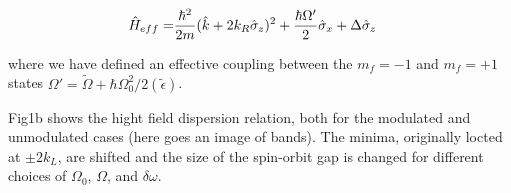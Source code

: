 \begin{align}
	\begin{split}
		\hat{H}_{eff} = & \frac{\hbar^2}{2m}(\hat{k}+2{{k_R}}\hat{\sigma}_z)^2 + \frac{\hbar\Omega'}{2}\hat{\sigma}_x  +\Delta\hat{\sigma}_z  
		\label{Eq:SOChalf}
	\end{split}
\end{align}	

where we have defined an effective coupling between the $m_f=-1$ and $m_f=+1$ states $\Omega'=\tilde{\Omega}+\hbar\Omega_0^2/2(\tilde{\epsilon})$. 


Fig1b shows the hight field dispersion relation, both for the modulated and unmodulated cases (here goes an image of bands). The minima, originally locted at $\pm2 k_L$, are shifted and the size of the spin-orbit gap is changed for different choices of $\Omega_0$, $\Omega$, and $\delta\omega$.  








